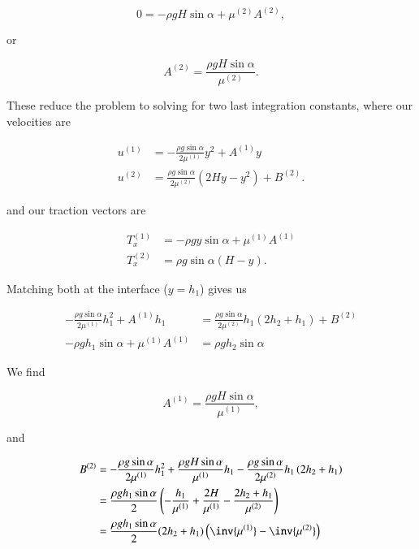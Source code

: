 \begin{equation}\label{eqn:twoLayerInclinedFlow:455}
0 = - \rho g H \sin\alpha + \mu^{(2)} A^{(2)},
\end{equation}

or

\begin{equation}\label{eqn:twoLayerInclinedFlow:475}
A^{(2)} = \frac{\rho g H \sin\alpha }{ \mu^{(2)} }.
\end{equation}

These reduce the problem to solving for two last integration constants, where our velocities are

\begin{align}\label{eqn:twoLayerInclinedFlow:495}
u^{(1)} &= -\frac{\rho g \sin\alpha }{2 \mu^{(1)}} y^2 + A^{(1)} y \\
u^{(2)} &= \frac{\rho g \sin\alpha }{2 \mu^{(2)}} \left( 2 H y -y^2 \right) + B^{(2)}.
\end{align}

and our traction vectors are

\begin{align}\label{eqn:twoLayerInclinedFlow:515}
T_x^{(1)} &= - \rho g y \sin\alpha + \mu^{(1)} A^{(1)} \\
T_x^{(2)} &= \rho g \sin\alpha \left( H - y \right).
\end{align}

Matching both at the interface ($y = h_1$) gives us

\begin{align}\label{eqn:twoLayerInclinedFlow:535}
-\frac{\rho g \sin\alpha }{2 \mu^{(1)}} h_1^2 + A^{(1)} h_1 &= \frac{\rho g \sin\alpha }{2 \mu^{(2)}} h_1 \left( 2 h_2 + h_1 \right) + B^{(2)} \\
- \rho g h_1 \sin\alpha + \mu^{(1)} A^{(1)} &= \rho g h_2 \sin\alpha 
\end{align}

We find

\begin{equation}\label{eqn:twoLayerInclinedFlow:555}
A^{(1)} = \frac{\rho g H \sin\alpha }{ \mu^{(1)} },
\end{equation}

and

\begin{align*}
B^{(2)} 
&=
-\frac{\rho g \sin\alpha }{2 \mu^{(1)}} h_1^2 + 
\frac{\rho g H \sin\alpha }{ \mu^{(1)} }
h_1 - \frac{\rho g \sin\alpha }{2 \mu^{(2)}} h_1 \left( 2 h_2 + h_1 \right) \\
&=
\frac{\rho g h_1 \sin\alpha }{2}
\left(
- \frac{h_1}{ \mu^{(1)}}
+ \frac{2 H}{ \mu^{(1)}}
- \frac{2 h_2 + h_1}{ \mu^{(2)}}
\right) \\
&=
\frac{\rho g h_1 \sin\alpha }{2} (2 h_2 + h_1) \left(
\inv{ \mu^{(1)}}
-\inv{ \mu^{(2)}}
\right)
\end{align*}

